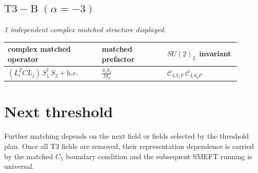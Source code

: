 \documentclass[9pt]{article}
\begin{document}
\subsection*{$ \mathrm{T3-B}\;(\alpha=-3) $}
\textit{1 independent complex matched structure displayed. }
\begin{longtable}{@{}p{0.36\linewidth}p{0.25\linewidth}p{0.29\linewidth}@{}}
\toprule
complex matched operator & matched prefactor & $SU(2)_L$ invariant \\
\midrule
$ (L_i^T C L_j)\,S_1^\dagger\,S_2+\mathrm{h.c.} $ & $ \frac{\overline{y_{1}} \overline{y_{2}}}{M_F} $ & $ \mathcal{C}_{LS_1F}\,\mathcal{C}_{LS_2F} $ \\
\bottomrule
\end{longtable}
\section*{Next threshold}
Further matching depends on the next field or fields selected by the threshold plan.  Once all T3 fields are removed, their representation dependence is carried by the matched $C_5$ boundary condition and the subsequent SMEFT running is universal.
\end{document}
